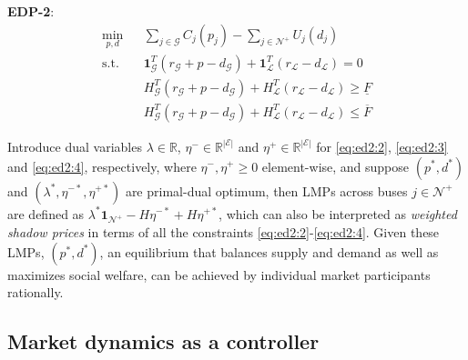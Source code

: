 \documentclass[journal,12pt,onecolumn,draftclsnofoot]{IEEEtran}
\begin{document}
\noindent
\textbf{EDP-2}:
\begin{subequations}
	\begin{eqnarray}
	\label{eq:ed2:1}
	\min_{p,d} &&   \sum_{j\in\mathcal{G}} C_j(p_j) - \sum_{j\in\mathcal{N}^+} U_j(d_j)   \\
	\label{eq:ed2:2}
	\mathrm{s.t.} &&   \mathbf 1^T_\mathcal{G} (r_\mathcal{G}+p-d_\mathcal{G})  + \mathbf 1^T_\mathcal{L} (r_\mathcal{L}-d_\mathcal{L})  = 0 \\
	\label{eq:ed2:3}
	&&    H^T_{\mathcal{G}}(r_\mathcal{G}+p-d_\mathcal{G}) + H^T_\mathcal{L}(r_\mathcal{L}-d_\mathcal{L}) \ge \underline{F}  \\
	\label{eq:ed2:4}
	&&  H^T_{\mathcal{G}}(r_\mathcal{G}+p-d_\mathcal{G}) + H^T_\mathcal{L}(r_\mathcal{L}-d_\mathcal{L})  \le  \overline{F}
	\end{eqnarray}	\label{eq:ed2}%
\end{subequations}
    
Introduce dual variables $\lambda\in\mathbb{R}$, $\eta^-\in\mathbb{R}^{|\mathcal{E}|}$ and $\eta^+\in\mathbb{R}^{|\mathcal{E}|}$ for \eqref{eq:ed2:2}, \eqref{eq:ed2:3} and \eqref{eq:ed2:4}, respectively, where $\eta^-,\eta^+ \ge 0$ element-wise, and suppose $(p^*,d^*)$ and $(\lambda^*,\eta^{-*},\eta^{+*})$ are primal-dual optimum, then LMPs across buses $j\in\mathcal{N}^+$ are defined as $\lambda^* \mathbf{1}_{\mathcal{N}^+} - H \eta^{-*}   + H \eta^{+*}$, which can also be interpreted as \emph{weighted shadow prices} in terms of all the constraints \eqref{eq:ed2:2}-\eqref{eq:ed2:4}. Given these LMPs, $(p^*,d^*)$, an equilibrium that balances supply and demand as well as maximizes social welfare, can be achieved by individual market participants rationally.

\subsection{Market dynamics as a controller}
\end{document}
